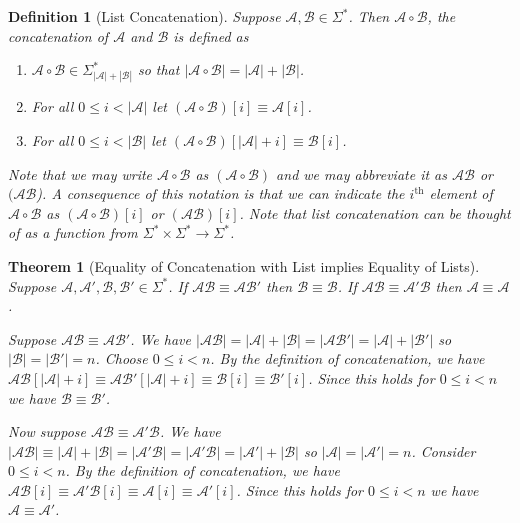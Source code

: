 \documentclass[12pt]{article}
\theoremstyle{break}
\newtheorem{definition}{Definition}[section]
\theoremstyle{break}
\newtheorem{theorem}{Theorem}[section]
\theoremstyle{break}
\theoremstyle{break}
\theoremstyle{break}
\newtheorem{informal definition}[definition]{Informal Definition}
\newcommand{\mc}[1]{\mathcal{#1}}
\begin{document}
\begin{definition}[List Concatenation]
Suppose $\mc{A}, \mc{B}\in\Sigma^*$.
Then $\mc{A}\circ \mc{B}$, the concatenation of $\mc{A}$ and $\mc{B}$ is defined as

\begin{enumerate}
\item{$\mc{A}\circ\mc{B} \in \Sigma_{|\mc{A}| + |\mc{B}|}^*$ so that $|\mc{A}\circ\mc{B}| = |\mc{A}| + |\mc{B}|$.}
\item{For all $0\le i < |\mc{A}|$ let $(\mc{A}\circ \mc{B})[i] \equiv \mc{A}[i]$.}
\item{For all $0\le i < |\mc{B}|$ let $(\mc{A}\circ\mc{B})[|\mc{A}| + i] \equiv \mc{B}[i]$.}
\end{enumerate}
Note that we may write $\mc{A}\circ\mc{B}$ as $(\mc{A}\circ\mc{B})$ and we may abbreviate it as $\mc{A}\mc{B}$ or $(\mc{A}\mc{B}$).
A consequence of this notation is that we can indicate the $i^{\text{th}}$ element of $\mc{A}\circ\mc{B}$ as $(\mc{A}\circ\mc{B})[i]$ or $(\mc{A}\mc{B})[i]$.
Note that list concatenation can be thought of as a function from $\Sigma^* \times \Sigma^* \to \Sigma^*$.
\end{definition}

\begin{theorem}[Equality of Concatenation with List implies Equality of Lists]
Suppose $\mc{A}, \mc{A}', \mc{B}, \mc{B}' \in \Sigma^*$.
If $\mc{A}\mc{B}\equiv \mc{A}\mc{B}'$ then $\mc{B}\equiv \mc{B}$.
If $\mc{A}\mc{B}\equiv \mc{A}'\mc{B}$ then $\mc{A}\equiv \mc{A}$.

Suppose $\mc{A}\mc{B} \equiv \mc{A}\mc{B}'$.
We have $|\mc{A}\mc{B}| = |\mc{A}| + |\mc{B}| = |\mc{A}\mc{B}'| = |\mc{A}| + |\mc{B}'|$ so $|\mc{B}| = |\mc{B}'| = n$.
Choose $0\le i < n$.
By the definition of concatenation, we have $\mc{A}\mc{B}[|\mc{A}| + i] \equiv \mc{A}\mc{B}'[|\mc{A}| + i] \equiv \mc{B}[i] \equiv \mc{B}'[i]$.
Since this holds for $0\le i < n$ we have $\mc{B} \equiv \mc{B}'$.

Now suppose $\mc{A}\mc{B}\equiv \mc{A}'\mc{B}$.
We have $|\mc{A}\mc{B}| \equiv |\mc{A}| + |\mc{B}| = |\mc{A}'\mc{B}| = |\mc{A}'\mc{B}| = |\mc{A}'| + |\mc{B}|$ so $|\mc{A}| = |\mc{A}'| = n$. Consider $0\le i < n$.
By the definition of concatenation, we have $\mc{A}\mc{B}[i] \equiv \mc{A}'\mc{B}[i] \equiv \mc{A}[i] \equiv \mc{A}'[i]$.
Since this holds for $0 \le i < n$ we have $\mc{A} \equiv \mc{A}'$.
\end{theorem}
\end{document}

